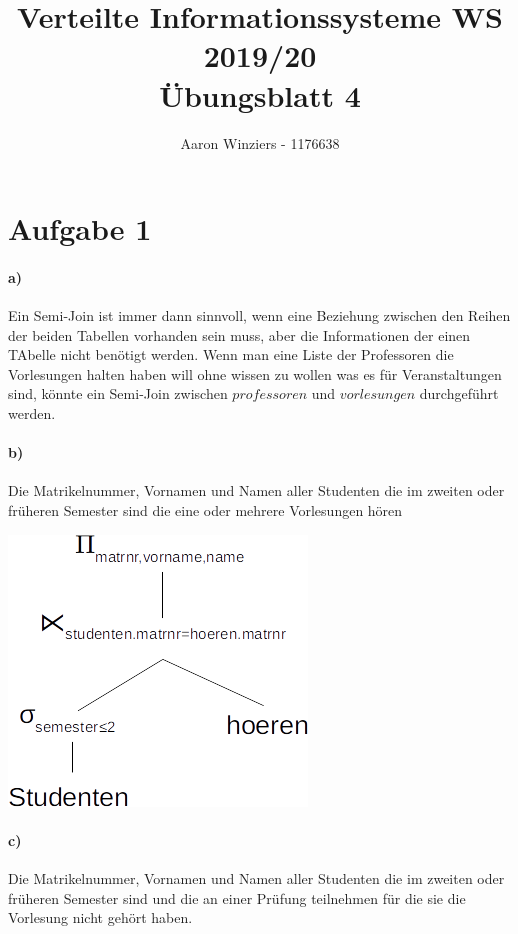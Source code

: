 \documentclass[11pt,a4paper,parskip=half ]{scrartcl}
\author{Aaron Winziers - 1176638}
\title{Verteilte Informationssysteme WS 2019/20\\\LARGE{Übungsblatt 4}}
\begin{document}
	\maketitle
	
	\section*{Aufgabe 1}
	\paragraph{a)} Ein Semi-Join ist immer dann sinnvoll, wenn eine Beziehung zwischen den Reihen der beiden Tabellen vorhanden sein muss, aber die Informationen der einen TAbelle nicht benötigt werden. Wenn man eine Liste der Professoren die Vorlesungen halten haben will ohne wissen zu wollen was es für Veranstaltungen sind, könnte ein Semi-Join zwischen $professoren$ und $vorlesungen$ durchgeführt werden.
	
	\paragraph{b)} Die Matrikelnummer, Vornamen und Namen aller Studenten die im zweiten oder früheren Semester sind die eine oder mehrere Vorlesungen hören
	
	\includegraphics[scale=.7]{1b.png}
	
	
	\paragraph{c)} Die Matrikelnummer, Vornamen und Namen aller Studenten die im zweiten oder früheren Semester sind und die an einer Prüfung teilnehmen für die sie die Vorlesung nicht gehört haben.
	
\end{document}
